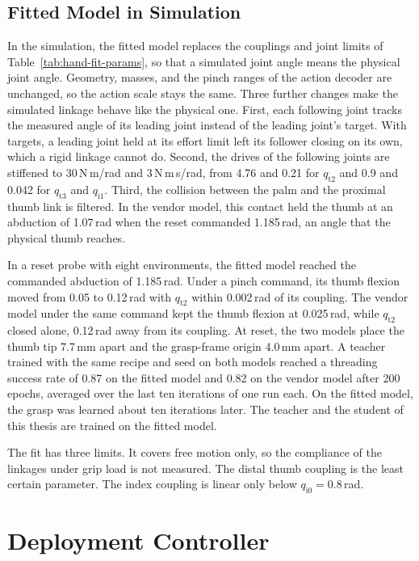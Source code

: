 \subsection{Fitted Model in Simulation}

In the simulation, the fitted model replaces the couplings and joint limits of Table~\ref{tab:hand-fit-params}, so that a simulated joint angle means the physical joint angle. Geometry, masses, and the pinch ranges of the action decoder are unchanged, so the action scale stays the same. Three further changes make the simulated linkage behave like the physical one. First, each following joint tracks the measured angle of its leading joint instead of the leading joint's target. With targets, a leading joint held at its effort limit left its follower closing on its own, which a rigid linkage cannot do. Second, the drives of the following joints are stiffened to 30\,N\,m/rad and 3\,N\,m\,s/rad, from 4.76 and 0.21 for $q_{\mathrm{t}2}$ and 0.9 and 0.042 for $q_{\mathrm{t}3}$ and $q_{\mathrm{i}1}$. Third, the collision between the palm and the proximal thumb link is filtered. In the vendor model, this contact held the thumb at an abduction of 1.07\,rad when the reset commanded 1.185\,rad, an angle that the physical thumb reaches.

In a reset probe with eight environments, the fitted model reached the commanded abduction of 1.185\,rad. Under a pinch command, its thumb flexion moved from 0.05 to 0.12\,rad with $q_{\mathrm{t}2}$ within 0.002\,rad of its coupling. The vendor model under the same command kept the thumb flexion at 0.025\,rad, while $q_{\mathrm{t}2}$ closed alone, 0.12\,rad away from its coupling. At reset, the two models place the thumb tip 7.7\,mm apart and the grasp-frame origin 4.0\,mm apart. A teacher trained with the same recipe and seed on both models reached a threading success rate of 0.87 on the fitted model and 0.82 on the vendor model after 200 epochs, averaged over the last ten iterations of one run each. On the fitted model, the grasp was learned about ten iterations later. The teacher and the student of this thesis are trained on the fitted model.

The fit has three limits. It covers free motion only, so the compliance of the linkages under grip load is not measured. The distal thumb coupling is the least certain parameter. The index coupling is linear only below $q_{\mathrm{i}0}=0.8$\,rad.

\section{Deployment Controller}\label{sec:app-ctrl-additions}

